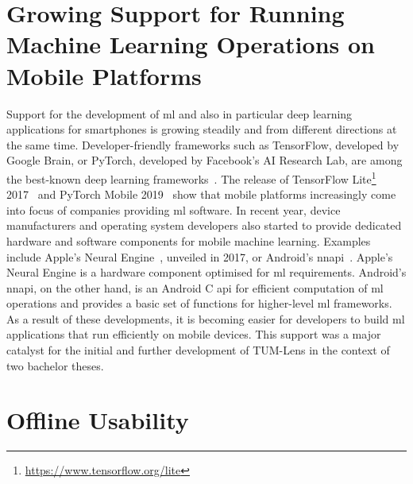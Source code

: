\documentclass[
			   fontsize=11pt,
               paper=a4,
               bibliography=totoc,
               idxtotoc,
               headsepline,
               footsepline,
               footinclude=false,
               BCOR=12mm,
               DIV=13,
               openany,   %
               ]
               {scrbook}
\begin{document}

\section{Growing Support for Running Machine Learning Operations on Mobile Platforms}

Support for the development of \gls{ml} and also in particular deep learning applications for smartphones is growing steadily and from different directions at the same time. Developer-friendly frameworks such as TensorFlow, developed by Google Brain, or PyTorch, developed by Facebook's AI Research Lab, are among the best-known deep learning frameworks~\cite{dl_ranking_2018}. The release of TensorFlow Lite\footnote{\url{https://www.tensorflow.org/lite}} 2017~\cite{tflite_release_verge_2017} and PyTorch Mobile 2019~\cite{pytorch_release_2019} show that mobile platforms increasingly come into focus of companies providing \acrlong{ml} software. In recent year, device manufacturers and operating system developers also started to provide dedicated hardware and software components for mobile machine learning. Examples include Apple's Neural Engine~\cite{neural_engine_verge_2017}, unveiled in 2017, or Android's \gls{nnapi}~\cite{nnapi_devguide_2021}. Apple's Neural Engine is a hardware component optimised for \acrlong{ml} requirements. Android's \gls{nnapi}, on the other hand, is an Android C \gls{api} for efficient computation of \gls{ml} operations and provides a basic set of functions for higher-level \gls{ml} frameworks. As a result of these developments, it is becoming easier for developers to build \gls{ml} applications that run efficiently on mobile devices. This support was a major catalyst for the initial and further development of TUM-Lens in the context of two bachelor theses.

\section{Offline Usability}
\end{document}
